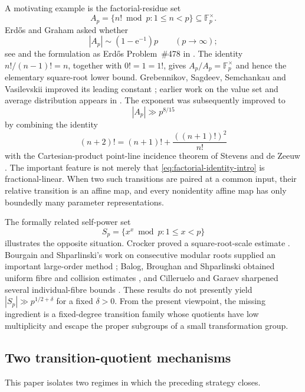 \documentclass[11pt,reqno]{amsart}
\numberwithin{equation}{section}
\theoremstyle{definition}
\theoremstyle{remark}
\newcommand{\F}{\mathbb F}
\begin{document}
A motivating example is the factorial-residue set
\[
  A_p=\{n!\bmod p:1\le n<p\}\subseteq\F_p^\times.
\]
Erd\H{o}s and Graham asked whether
\[
  |A_p|\sim(1-\mathrm e^{-1})p
  \qquad (p\to\infty);
\]
see \cite{ErdosGraham1980} and the formulation as Erd\H{o}s Problem~\#478 in \cite{Bloom478}.  The identity $n!/(n-1)!=n$, together with $0!=1=1!$, gives $A_p/A_p=\F_p^\times$ and hence the elementary square-root lower bound.  Grebennikov, Sagdeev, Semchankau and Vasilevskii improved its leading constant \cite{GrebennikovEtAl2024}; earlier work on the value set and average distribution appears in \cite{BanksEtAl2005,KlurmanMunsch2017}.  The exponent was subsequently improved to
\begin{equation}\label{eq:factorial-known}
  |A_p|\gg p^{8/15}
\end{equation}
by combining the identity
\begin{equation}\label{eq:factorial-identity-intro}
  (n+2)!=(n+1)!+\frac{((n+1)!)^2}{n!}
\end{equation}
with the Cartesian-product point-line incidence theorem of Stevens and de Zeeuw \cite{HuFactorials2026,StevensDeZeeuw2017}.  The important feature is not merely that \eqref{eq:factorial-identity-intro} is fractional-linear.  When two such transitions are paired at a common input, their relative transition is an affine map, and every nonidentity affine map has only boundedly many parameter representations.

The formally related self-power set
\[
  S_p=\{x^x\bmod p:1\le x<p\}
\]
illustrates the opposite situation.  Crocker proved a square-root-scale estimate \cite{Crocker1969}.  Bourgain and Shparlinski's work on consecutive modular roots supplied an important large-order method \cite{BourgainShparlinski2008}; Balog, Broughan and Shparlinski obtained uniform fibre and collision estimates \cite{BalogBroughanShparlinski2011}, and Cilleruelo and Garaev sharpened several individual-fibre bounds \cite{CillerueloGaraev2016}.  These results do not presently yield $|S_p|\gg p^{1/2+\delta}$ for a fixed $\delta>0$.  From the present viewpoint, the missing ingredient is a fixed-degree transition family whose quotients have low multiplicity and escape the proper subgroups of a small transformation group.

\subsection{Two transition-quotient mechanisms}

This paper isolates two regimes in which the preceding strategy closes.
\end{document}
